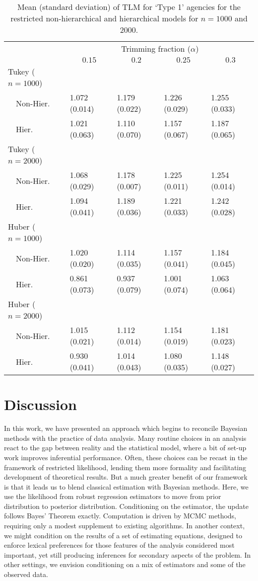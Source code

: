\documentclass[12pt]{article}
\begin{document}
\begin{table}[!tbp]
{\small
\begin{center}
\begin{tabular}{lllll}
\hline\hline
& \multicolumn{4}{c}{Trimming fraction ($\alpha$)}\\
\multicolumn{1}{l}{}&\multicolumn{1}{c}{$0.15$}&\multicolumn{1}{c}{$0.2$}&\multicolumn{1}{c}{$0.25$}&\multicolumn{1}{c}{$0.3$}\tabularnewline
\hline
{\mdseries Tukey ($n=1000$)}&&&&\tabularnewline
~~Non-Hier.&1.072 (0.014)&1.179 (0.022)&1.226 (0.029)&1.255 (0.033)\tabularnewline
~~Hier.&1.021 (0.063)&1.110 (0.070)&1.157 (0.067)&1.187 (0.065)\tabularnewline
\hline
{\mdseries Tukey ($n=2000$) }&&&&\tabularnewline
~~Non-Hier.&1.068 (0.029)&1.178 (0.007)&1.225 (0.011)&1.254 (0.014)\tabularnewline
~~Hier.&1.094 (0.041)&1.189 (0.036)&1.221 (0.033)&1.242 (0.028)\tabularnewline
\hline
{\mdseries Huber  ($n=1000$)}&&&&\tabularnewline
~~Non-Hier.&1.020 (0.020)&1.114 (0.035)&1.157 (0.041)&1.184 (0.045)\tabularnewline
~~Hier.&0.861 (0.073)&0.937 (0.079)&1.001 (0.074)&1.063 (0.064)\tabularnewline
\hline
{\mdseries Huber ($n=2000$)}&&&&\tabularnewline
~~Non-Hier.&1.015 (0.021)&1.112 (0.014)&1.154 (0.019)&1.181 (0.023)\tabularnewline
~~Hier.&0.930 (0.041)&1.014 (0.043)&1.080 (0.035)&1.148 (0.027)\tabularnewline
\hline
\end{tabular}
\end{center}
\caption{Mean (standard deviation) of TLM for `Type 1' agencies for the restricted non-hierarchical and hierarchical models for $n=1000$ and $2000$.} \label{tab:tlmTable}
}
\end{table}


\section{Discussion}
\label{Conclusions}

In this work, we have presented an approach which begins to reconcile
Bayesian methods with the practice of data analysis.  Many routine
choices in an analysis react to the gap between reality and the
statistical model, where a bit of set-up work improves inferential
performance.  Often, these choices can be recast in the framework of
restricted likelihood, lending them more formality and facilitating
development of theoretical results.  But a much greater benefit of our
framework is that it leads us to blend classical estimation with
Bayesian methods.  Here, we use the likelihood from robust regression
estimators to move from prior distribution to posterior distribution.
Conditioning on the estimator, the update follows Bayes' Theorem
exactly.   Computation is driven by MCMC methods, requiring only a modest supplement to existing algorithms.  In another context, we might condition on the results of a set of estimating equations, designed to enforce lexical preferences for those features of the analysis considered most important, yet still producing inferences for secondary aspects of the problem.  In other settings, we envision conditioning on a mix of estimators and some of the observed data.  
\end{document}

